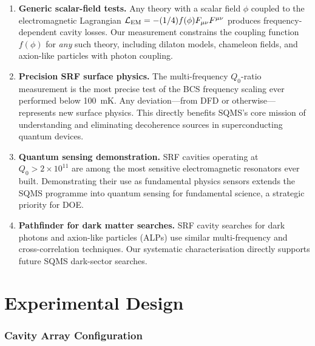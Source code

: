 \documentclass[11pt]{article}
\newcommand{\ee}[1]{\times 10^{#1}}
\begin{document}
\begin{enumerate}
\item \textbf{Generic scalar-field tests.} Any theory with a scalar
  field $\phi$ coupled to the electromagnetic Lagrangian
  $\mathcal{L}_{\rm EM} = -(1/4)f(\phi)F_{\mu\nu}F^{\mu\nu}$
  produces frequency-dependent cavity losses. Our measurement constrains
  the coupling function $f(\phi)$ for \textit{any} such theory, including
  dilaton models, chameleon fields, and axion-like particles with
  photon coupling.

\item \textbf{Precision SRF surface physics.} The multi-frequency
  $Q_0$-ratio measurement is the most precise test of the BCS
  frequency scaling ever performed below 100~mK. Any deviation---from
  DFD or otherwise---represents new surface physics. This directly
  benefits SQMS's core mission of understanding and eliminating
  decoherence sources in superconducting quantum devices.

\item \textbf{Quantum sensing demonstration.} SRF cavities operating at
  $Q_0 > 2\ee{11}$ are among the most sensitive electromagnetic
  resonators ever built. Demonstrating their use as fundamental physics
  sensors extends the SQMS programme into quantum sensing for
  fundamental science, a strategic priority for DOE.

\item \textbf{Pathfinder for dark matter searches.} SRF cavity searches
  for dark photons and axion-like particles (ALPs) use similar
  multi-frequency and cross-correlation techniques. Our systematic
  characterisation directly supports future SQMS dark-sector searches.
\end{enumerate}


\part{Experimental Design}

\section{Cavity Array Configuration}
\label{sec:cavity_config}
\end{document}
